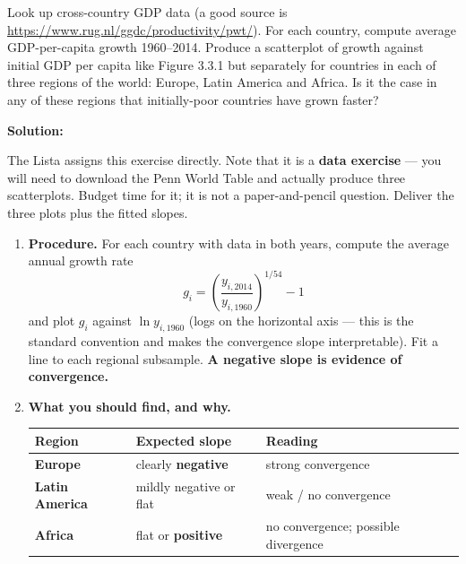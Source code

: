 \documentclass[12pt, letterpaper]{article}
\begin{document}
\begin{tcolorbox}[oddbox,title={Problem 3.3 \quad Within-Region Convergence}]
\begin{tcolorbox}[questionbox]
Look up cross-country GDP data (a good source is
\url{https://www.rug.nl/ggdc/productivity/pwt/}). For each country, compute average
GDP-per-capita growth 1960--2014. Produce a scatterplot of growth against initial GDP per
capita like Figure 3.3.1 but separately for countries in each of three regions of the world:
Europe, Latin America and Africa. Is it the case in any of these regions that initially-poor
countries have grown faster?
\end{tcolorbox}

\textbf{Solution:}

\begin{tcolorbox}[theorybox,title={This is question 3 of Lista de Exerc\'icios 1 (2 pts)}]
The Lista assigns this exercise directly. Note that it is a \textbf{data exercise} --- you
will need to download the Penn World Table and actually produce three scatterplots. Budget
time for it; it is not a paper-and-pencil question. Deliver the three plots plus the fitted
slopes.
\end{tcolorbox}

\begin{enumerate}

\item \textbf{Procedure.} For each country with data in both years, compute the average
annual growth rate
$$g_i = \left(\frac{y_{i,2014}}{y_{i,1960}}\right)^{1/54} - 1$$
and plot $g_i$ against $\ln y_{i,1960}$ (logs on the horizontal axis --- this is the standard
convention and makes the convergence slope interpretable). Fit a line to each regional
subsample. \textbf{A negative slope is evidence of convergence.}

\item \textbf{What you should find, and why.}

\begin{center}
\begin{tabular}{lll}
\toprule
\textbf{Region} & \textbf{Expected slope} & \textbf{Reading} \\
\midrule
\textbf{Europe} & clearly \textbf{negative} & strong convergence \\
\textbf{Latin America} & mildly negative or flat & weak / no convergence \\
\textbf{Africa} & flat or \textbf{positive} & no convergence; possible divergence \\
\bottomrule
\end{tabular}
\end{center}


\end{enumerate}
\end{tcolorbox}
\end{document}
